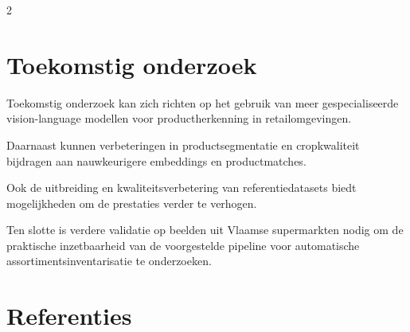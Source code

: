 \documentclass[a0,portrait]{hogent-poster}
\begin{document}
\begin{multicols}{2}
\section{Toekomstig onderzoek}

Toekomstig onderzoek kan zich richten op het gebruik van meer gespecialiseerde vision-language modellen voor productherkenning in retailomgevingen. 

Daarnaast kunnen verbeteringen in productsegmentatie en cropkwaliteit bijdragen aan nauwkeurigere embeddings en productmatches. 

Ook de uitbreiding en kwaliteitsverbetering van referentiedatasets biedt mogelijkheden om de prestaties verder te verhogen. 

Ten slotte is verdere validatie op beelden uit Vlaamse supermarkten nodig om de praktische inzetbaarheid van de voorgestelde pipeline voor automatische assortimentsinventarisatie te onderzoeken.

\end{multicols}

\section*{Referenties}

\begin{minipage}{0.75\linewidth}
\renewcommand*{\bibfont}{\fontsize{14}{15}\selectfont}
\printbibliography[heading=none]
\end{minipage}
\end{document}
